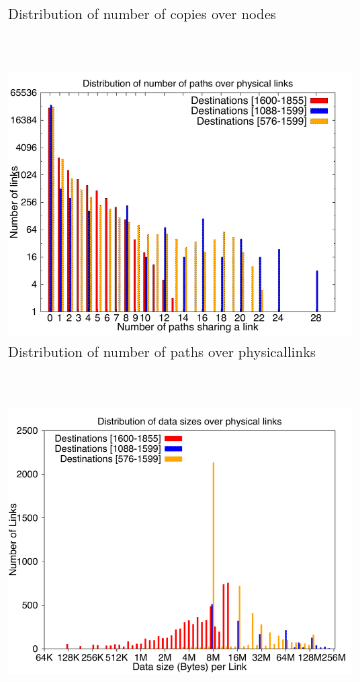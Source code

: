 \begin{figure}[!htbp]
\begin{subfigure}[b]{0.49\textwidth}
                \caption{Distribution of number of copies over nodes}
                \label{fig:incrsize_2k_copy}
        \end{subfigure}
        ~ %
        \begin{subfigure}[b]{0.49\textwidth}
                \includegraphics[width=\textwidth]{report_figures/incrsize/2k/loadpath_histo.pdf}
                \caption{Distribution of number of paths over physicallinks}
                \label{fig:incrsize_2k_loadpath}
        \end{subfigure}
        ~ %
        \begin{subfigure}[b]{0.49\textwidth}
                \includegraphics[width=\textwidth]{report_figures/incrsize/2k/loaddata_histo.pdf}

\end{subfigure}
\end{figure}
